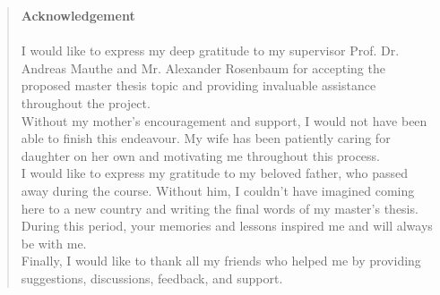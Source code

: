 
\pagestyle{plain}


\begin{quote}
	\textbf{\Large Acknowledgement}\\\\
I would like to express my deep gratitude to my supervisor Prof$.$ Dr$.$ Andreas Mauthe and Mr$.$ Alexander Rosenbaum for accepting the proposed master thesis topic and providing invaluable assistance throughout the project. \\
Without my mother's encouragement and support, I would not have been able to finish this endeavour. My wife has been patiently caring for daughter on her own and motivating me throughout this process. \\
I would like to express my gratitude to my beloved father, who passed away during the course. Without him, I couldn't have imagined coming here to a new country and writing the final words of my master's thesis. During this period, your memories and lessons inspired me and will always be with me. \\
Finally, I would like to thank all my friends who helped me by providing suggestions, discussions, feedback, and support.
 \end{quote}
